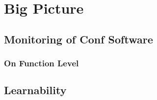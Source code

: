 \chapter{Big Picture}
\label{chap:method}

\section{Monitoring of Conf Software}


\subsection{On Function Level}


\section{Learnability}